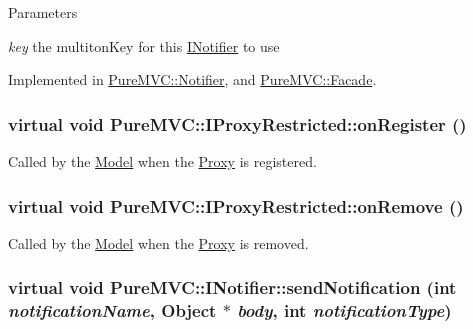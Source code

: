 \begin{DoxyParams}{Parameters}
\item[{\em key}]the multitonKey for this \hyperlink{class_pure_m_v_c_1_1_i_notifier}{INotifier} to use \end{DoxyParams}


Implemented in \hyperlink{class_pure_m_v_c_1_1_notifier_a6910365c70415ba7973401215f57e4af}{PureMVC::Notifier}, and \hyperlink{class_pure_m_v_c_1_1_facade_a94c72ff29f9f42ff084f247b180fb4ad}{PureMVC::Facade}.\hypertarget{class_pure_m_v_c_1_1_i_proxy_restricted_a450f14bba0bde7c94e5868e844f1fdf2}{
\subsubsection[{onRegister}]{\setlength{\rightskip}{0pt plus 5cm}virtual void PureMVC::IProxyRestricted::onRegister ()}}
\label{class_pure_m_v_c_1_1_i_proxy_restricted_a450f14bba0bde7c94e5868e844f1fdf2}


Called by the \hyperlink{class_pure_m_v_c_1_1_model}{Model} when the \hyperlink{class_pure_m_v_c_1_1_proxy}{Proxy} is registered. \hypertarget{class_pure_m_v_c_1_1_i_proxy_restricted_a6d883fcf5a5e241321f5b5d9521ba158}{
\subsubsection[{onRemove}]{\setlength{\rightskip}{0pt plus 5cm}virtual void PureMVC::IProxyRestricted::onRemove ()}}
\label{class_pure_m_v_c_1_1_i_proxy_restricted_a6d883fcf5a5e241321f5b5d9521ba158}


Called by the \hyperlink{class_pure_m_v_c_1_1_model}{Model} when the \hyperlink{class_pure_m_v_c_1_1_proxy}{Proxy} is removed. \hypertarget{class_pure_m_v_c_1_1_i_notifier_a65e8333ccfea74138b79f84dac96af25}{
\subsubsection[{sendNotification}]{\setlength{\rightskip}{0pt plus 5cm}virtual void PureMVC::INotifier::sendNotification (int {\em notificationName}, \/  {\bf Object} $\ast$ {\em body}, \/  int {\em notificationType})}}
\label{class_pure_m_v_c_1_1_i_notifier_a65e8333ccfea74138b79f84dac96af25}



